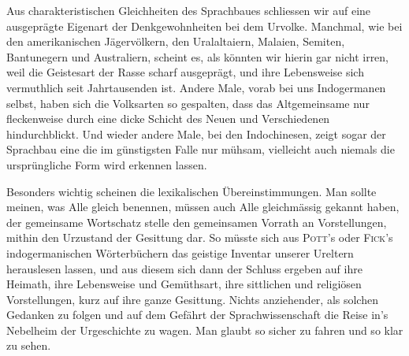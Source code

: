 {Aus charakteristischen Gleichheiten des Sprachbaues schliessen wir auf eine ausgeprägte Eigenart der Denkgewohnheiten bei dem Urvolke. Manchmal, wie bei den amerikanischen Jägervölkern, den Uralaltaiern, Malaien, Semiten, Bantunegern und Australiern, scheint es, als könnten wir hierin gar nicht irren, weil die Geistesart der Rasse scharf ausgeprägt, und ihre Lebensweise sich vermuthlich seit Jahrtausenden  ist. Andere Male, vorab bei uns Indogermanen selbst, haben sich die Volksarten so gespalten, dass das Altgemeinsame nur fleckenweise durch eine dicke Schicht des Neuen und Verschiedenen hindurchblickt. Und wieder andere Male, bei den Indochinesen, zeigt sogar der Sprachbau eine  die im günstigsten Falle nur mühsam, vielleicht auch niemals die ursprüngliche Form wird erkennen lassen.

Besonders wichtig scheinen die lexikalischen Übereinstimmungen. \label{fp.288} Man sollte meinen, was Alle gleich benennen, müssen auch Alle gleichmässig gekannt haben, der gemeinsame Wortschatz stelle den gemeinsamen Vorrath an Vorstellungen, mithin den Urzustand der Gesittung dar. So müsste sich aus \textsc{Pott}’s oder \textsc{Fick}’s indogermanischen Wörterbüchern das geistige Inventar unserer Ureltern herauslesen lassen, und aus diesem sich dann der Schluss ergeben auf ihre Heimath, ihre Lebensweise und Gemüthsart, ihre sittlichen und religiösen \label{sp.294} Vorstellungen, kurz auf ihre ganze Gesittung. Nichts anziehender, als solchen  Gedanken zu folgen und auf dem Gefährt der Sprachwissenschaft die Reise in’s Nebelheim der Urgeschichte zu wagen. Man glaubt so sicher zu fahren und so klar zu sehen.

}
